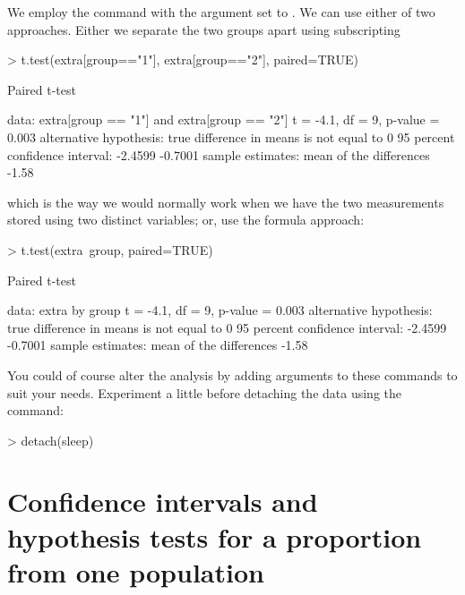 We employ the  command with the  argument set to . We can use either of two approaches. Either we separate the two groups apart using subscripting 
\begin{Schunk}
\begin{Sinput}
> t.test(extra[group=="1"], extra[group=="2"], paired=TRUE) 
\end{Sinput}
\begin{Soutput}

	Paired t-test

data:  extra[group == "1"] and extra[group == "2"]
t = -4.1, df = 9, p-value = 0.003
alternative hypothesis: true difference in means is not equal to 0
95 percent confidence interval:
 -2.4599 -0.7001
sample estimates:
mean of the differences 
                  -1.58 
\end{Soutput}
\end{Schunk}
 
which is the way we would normally work when we have the two measurements stored using two distinct variables; or, use the formula approach: 
\begin{Schunk}
\begin{Sinput}
> t.test(extra~group, paired=TRUE) 
\end{Sinput}
\begin{Soutput}

	Paired t-test

data:  extra by group
t = -4.1, df = 9, p-value = 0.003
alternative hypothesis: true difference in means is not equal to 0
95 percent confidence interval:
 -2.4599 -0.7001
sample estimates:
mean of the differences 
                  -1.58 
\end{Soutput}
\end{Schunk}
 
You could of course alter the analysis by adding arguments to these commands to suit your needs. Experiment a little before detaching the  data using the  command: 
\begin{Schunk}
\begin{Sinput}
> detach(sleep) 
\end{Sinput}
\end{Schunk}
 
 
\section{Confidence intervals and hypothesis tests for a proportion from one population} 
 
